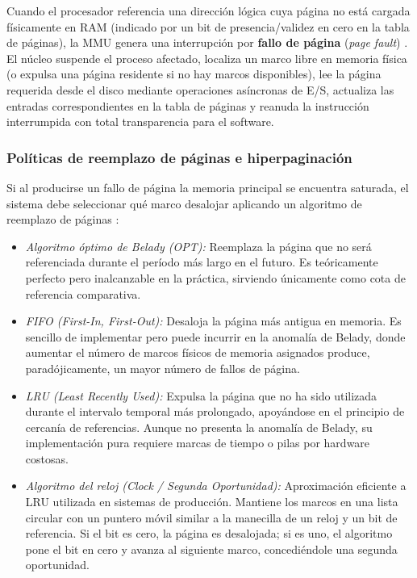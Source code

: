 \documentclass[12pt]{article}
\begin{document}
Cuando el procesador referencia una dirección lógica cuya página no está cargada físicamente en RAM (indicado por un bit de presencia/validez en cero en la tabla de páginas), la MMU genera una interrupción por \textbf{fallo de página} (\textit{page fault}) \parencite[\S 9.2, pp.\ 318--324]{silberschatz2006fundamentos}. El núcleo suspende el proceso afectado, localiza un marco libre en memoria física (o expulsa una página residente si no hay marcos disponibles), lee la página requerida desde el disco mediante operaciones asíncronas de E/S, actualiza las entradas correspondientes en la tabla de páginas y reanuda la instrucción interrumpida con total transparencia para el software.

\subsubsection{Políticas de reemplazo de páginas e hiperpaginación}
Si al producirse un fallo de página la memoria principal se encuentra saturada, el sistema debe seleccionar qué marco desalojar aplicando un algoritmo de reemplazo de páginas \parencite[\S 8.2, pp.\ 372--382]{stallings2018operating}:
\begin{itemize}[leftmargin=*]
    \item \textit{Algoritmo óptimo de Belady (OPT):} Reemplaza la página que no será referenciada durante el período más largo en el futuro. Es teóricamente perfecto pero inalcanzable en la práctica, sirviendo únicamente como cota de referencia comparativa.
    \item \textit{FIFO (First-In, First-Out):} Desaloja la página más antigua en memoria. Es sencillo de implementar pero puede incurrir en la anomalía de Belady, donde aumentar el número de marcos físicos de memoria asignados produce, paradójicamente, un mayor número de fallos de página.
    \item \textit{LRU (Least Recently Used):} Expulsa la página que no ha sido utilizada durante el intervalo temporal más prolongado, apoyándose en el principio de cercanía de referencias. Aunque no presenta la anomalía de Belady, su implementación pura requiere marcas de tiempo o pilas por hardware costosas.
    \item \textit{Algoritmo del reloj (Clock / Segunda Oportunidad):} Aproximación eficiente a LRU utilizada en sistemas de producción. Mantiene los marcos en una lista circular con un puntero móvil similar a la manecilla de un reloj y un bit de referencia. Si el bit es cero, la página es desalojada; si es uno, el algoritmo pone el bit en cero y avanza al siguiente marco, concediéndole una segunda oportunidad.
\end{itemize}
\end{document}
